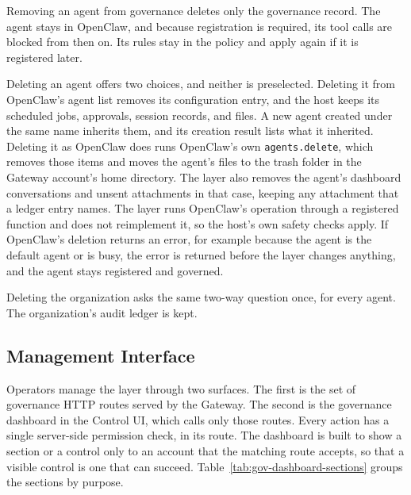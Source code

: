 Removing an agent from governance deletes only the governance record. The
agent stays in OpenClaw, and because registration is required, its tool
calls are blocked from then on. Its rules stay in the policy and apply
again if it is registered later.

Deleting an agent offers two choices, and neither is preselected. Deleting
it from OpenClaw's agent list removes its configuration entry, and the
host keeps its scheduled jobs, approvals, session records, and files. A new
agent created under the same name inherits them, and its creation result
lists what it inherited. Deleting it as OpenClaw does runs OpenClaw's own
\texttt{agents.delete}, which removes those items and moves the agent's
files to the trash folder in the Gateway account's home directory. The
layer also removes the agent's dashboard conversations and unsent
attachments in that case, keeping any attachment that a ledger entry names.
The layer runs OpenClaw's operation through a registered function and does
not reimplement it, so the host's own safety checks apply. If OpenClaw's
deletion returns an error, for example because the agent is the default
agent or is busy, the error is returned before the layer changes anything, and the
agent stays registered and governed.

Deleting the organization asks the same two-way question once, for every
agent. The organization's audit ledger is kept.

\subsection{Management Interface}
\label{sec:gov-dashboard}

Operators manage the layer through two surfaces. The first is the set of
governance HTTP routes served by the Gateway. The second is the governance
dashboard in the Control UI, which calls only those routes. Every action has a single server-side
permission check, in its route. The dashboard is built to show a section or
a control only to an account that the matching route accepts, so that a
visible control is one that can succeed. Table~\ref{tab:gov-dashboard-sections}
groups the sections by purpose.

